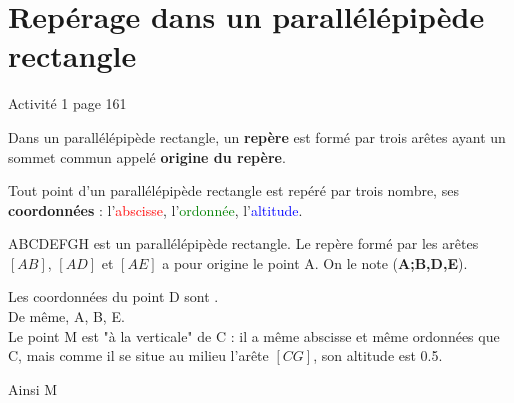 \documentclass[12pt,a4paper]{article}
\date{}
\title{}
\begin{document}
	
	
	

\section{Repérage dans un parallélépipède rectangle}

\begin{myact}
	Activité 1 page 161
\end{myact}


\begin{mydef}

	Dans un parallélépipède rectangle, un \textbf{repère} est formé par trois arêtes ayant un sommet commun appelé \textbf{origine du repère}.

\end{mydef}

\begin{myprop}
	Tout point d'un parallélépipède rectangle est repéré par trois nombre, ses \textbf{coordonnées} : l'\textcolor{red}{abscisse}, l'\textcolor{green}{ordonnée}, l'\textcolor{blue}{altitude}.
\end{myprop}

\begin{myex}
	
	\begin{multicols}{2}
	ABCDEFGH est un parallélépipède rectangle. 
	Le repère formé par les arêtes $[AB]$, $[AD]$ et $[AE]$ a pour origine le point A. On le note (\textbf{A;B,D,E}).
	
	Les coordonnées du point D sont .\\
	
	De même, A, B, E.\\
	
	Le point M est "à la verticale" de C : il a même abscisse et même ordonnées que C, mais comme il se situe au milieu l'arête $[CG]$, son altitude est \num{0.5}. 
	
	Ainsi M
	\begin{center}
		
	\end{center} 
	\end{multicols}
\end{myex}
\end{document}

